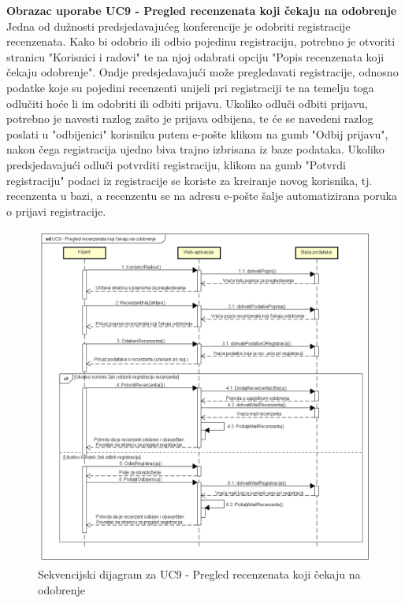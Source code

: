 				\textbf{Obrazac uporabe UC9 - Pregled recenzenata koji čekaju na odobrenje}\\
				Jedna od dužnosti predsjedavajućeg konferencije je odobriti registracije recenzenata. Kako bi odobrio ili odbio pojedinu registraciju, potrebno je otvoriti stranicu "Korisnici i radovi" te na njoj odabrati opciju "Popis recenzenata koji čekaju odobrenje". Ondje predsjedavajući može pregledavati registracije, odnosno podatke koje su pojedini recenzenti unijeli pri registraciji te na temelju toga odlučiti hoće li im odobriti ili odbiti prijavu. Ukoliko odluči odbiti prijavu, potrebno je navesti razlog zašto je prijava odbijena, te će se navedeni razlog poslati u "odbijenici" korisniku putem e-pošte klikom na gumb "Odbij prijavu", nakon čega registracija ujedno biva trajno izbrisana iz baze podataka. Ukoliko predsjedavajući odluči potvrditi registraciju, klikom na gumb "Potvrdi registraciju" podaci iz registracije se koriste za kreiranje novog korisnika, tj. recenzenta u bazi, a recenzentu se na adresu e-pošte šalje automatizirana poruka o prijavi registracije.
				\eject

				\begin{figure}[H]
					\includegraphics[scale=0.50]{dijagrami/UC9-RegistrRecenzent.png} 
					\centering
					\caption{Sekvencijski dijagram za UC9 - Pregled recenzenata koji čekaju na odobrenje}
					\label{fig:sekvencijski1}
				\end{figure}


